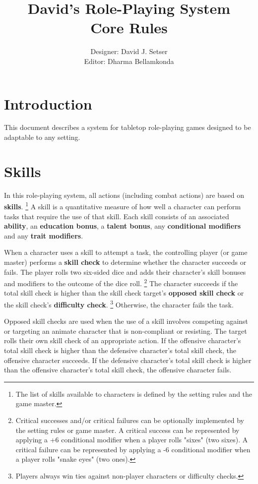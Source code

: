 \documentclass[11pt]{article}
\title{\textbf{David's Role-Playing System\\
Core Rules}}
\author{Designer: David J. Setser\\
Editor: Dharma Bellamkonda}
\date{}
\begin{document}
\maketitle

\section{Introduction}

This document describes a system for tabletop role-playing games designed to be adaptable to any setting.

\section{Skills}
In this role-playing system, all actions (including combat actions) are based on \textbf{skills}.
\footnote{The list of skills available to characters is defined by the setting rules and the game master.}
A skill is a quantitative measure of how well a character can perform tasks that require the use of that skill.
Each skill consists of an associated \textbf{ability}, an \textbf{education bonus}, a \textbf{talent bonus}, any \textbf{conditional modifiers} and any \textbf{trait modifiers}.

When a character uses a skill to attempt a task, the controlling player (or game master) performs a \textbf{skill check} to determine whether the character succeeds or fails.
The player rolls two six-sided dice and adds their character's skill bonuses and modifiers to the outcome of the dice roll.
\footnote{Critical successes and/or critical failures can be optionally implemented by the setting rules or game master.
A critical success can be represented by applying a +6 conditional modifier when a player rolls "sixes" (two sixes).
A critical failure can be represented by applying a -6 conditional modifier when a player rolls "snake eyes" (two ones).}
The character succeeds if the total skill check is higher than the skill check target's \textbf{opposed skill check} or the skill check's \textbf{difficulty check}.
\footnote{Players always win ties against non-player characters or difficulty checks.} Otherwise, the character fails the task.

Opposed skill checks are used when the use of a skill involves competing against or targeting an animate character that is non-compliant or resisting.
The target rolls their own skill check of an appropriate action.
If the offensive character's total skill check is higher than the defensive character's total skill check, the offensive character succeeds.
If the defensive character's total skill check is higher than the offensive character's total skill check, the offensive character fails.
\end{document}
